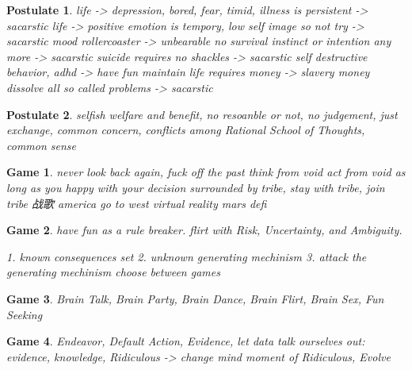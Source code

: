 \documentclass{article}
\newtheorem{postulate}{Postulate}
\newtheorem{game}{Game}
\begin{document}
\begin{postulate}
    life -> depression, bored, fear, timid, illness is persistent -> sacarstic
    life -> positive emotion is tempory, low self image so not  try -> sacarstic
    mood rollercoaster -> unbearable
    no survival instinct or intention any more -> sacarstic
    suicide requires no shackles -> sacarstic
    self destructive behavior, adhd -> have fun
    maintain life requires money -> slavery
    money dissolve all so called problems -> sacarstic
\end{postulate}

\begin{postulate}
    selfish welfare and benefit,
    no resoanble or not,
    no  judgement,
    just exchange,
    common concern,
    conflicts among {Rational School of Thoughts, common sense}
\end{postulate}

\begin{game}
    never look back again, fuck off the past
    think from void
    act from void
    as long as you happy with your decision
    surrounded by tribe, stay with tribe, join tribe
    战歌
    america
    go to west
    virtual reality
    mars
    defi
\end{game}

\begin{game}
    have fun as a rule breaker.
    flirt with Risk, Uncertainty, and Ambiguity.

    1. known {consequences set}
    2. unknown generating mechinism
    3. attack the generating mechinism
        choose between games
\end{game}

\begin{game}
    Brain Talk,
    Brain Party,
    Brain Dance,
    Brain Flirt,
    Brain Sex,
    Fun Seeking
\end{game}

\begin{game}
    Endeavor,
    Default Action,
    Evidence,
    let data talk ourselves out:  evidence, knowledge, Ridiculous -> change mind
    moment of Ridiculous,
    Evolve
\end{game}
\end{document}
